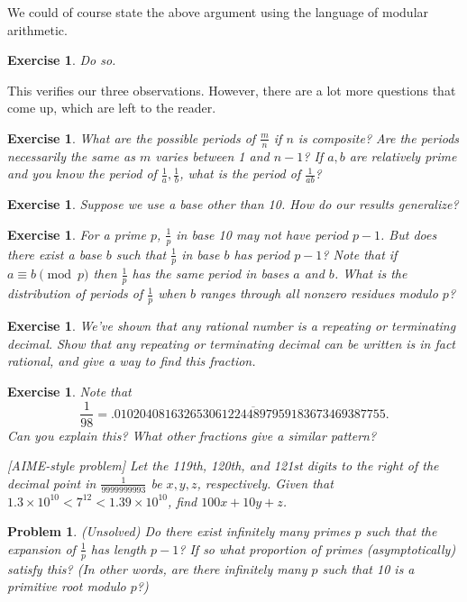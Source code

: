 \documentclass[12pt,twoside]{article}
\theoremstyle{norm}
\newtheorem{exr}[thm]{Exercise}
\newtheorem{prb}[thm]{Problem}
\newcommand{\rc}[1]{\frac{1}{#1}}
\begin{document}
We could of course state the above argument using the language of modular arithmetic.
\begin{exr}
Do so.
\end{exr}
This verifies our three observations. However, there are a lot more questions that come up, which are left to the reader.
\begin{exr}
What are the possible periods of $\frac{m}{n}$ if $n$ is composite? Are the periods necessarily the same as $m$ varies between 1 and $n-1$? If $a,b$ are relatively prime and you know the period of $\rc a,\rc b$, what is the period of $\rc{ab}$?
\end{exr}
\begin{exr}
Suppose we use a base other than 10. How do our results generalize?
\end{exr}
\begin{exr}
For a prime $p$, $\rc{p}$ in base 10 may not have period $p-1$. But does there exist a base $b$ such that $\rc{p}$ in base $b$ has period $p-1$? Note that if $a\equiv b\pmod{p}$ then $\rc{p}$ has the same period in bases $a$ and $b$. What is the distribution of periods of $\rc{p}$ when $b$ ranges through all nonzero residues modulo $p$?
\end{exr}
\begin{exr}
We've shown that any rational number is a repeating or terminating decimal. Show that any repeating or terminating decimal can be written is in fact rational, and give a way to find this fraction. 
\end{exr}
\begin{exr}
Note that
\[\frac{1}{98}=.0\overline{102040816326530612244897959183673469387755}.\]
Can you explain this? What other fractions give a similar pattern?

[AIME-style problem] Let the 119th, 120th, and 121st digits to the right of the decimal point in $\frac{1}{9999999993}$ be $x,y,z$, respectively. Given that $1.3\times 10^{10}<7^{12}<1.39\times 10^{10}$, find $100x+10y+z$.
\end{exr}
\begin{prb}(Unsolved)
Do there exist infinitely many primes $p$ such that the expansion of $\rc p$ has length $p-1$? If so what proportion of primes (asymptotically) satisfy this? (In other words, are there infinitely many $p$ such that 10 is a primitive root modulo $p$?)
\end{prb}
\end{document}
